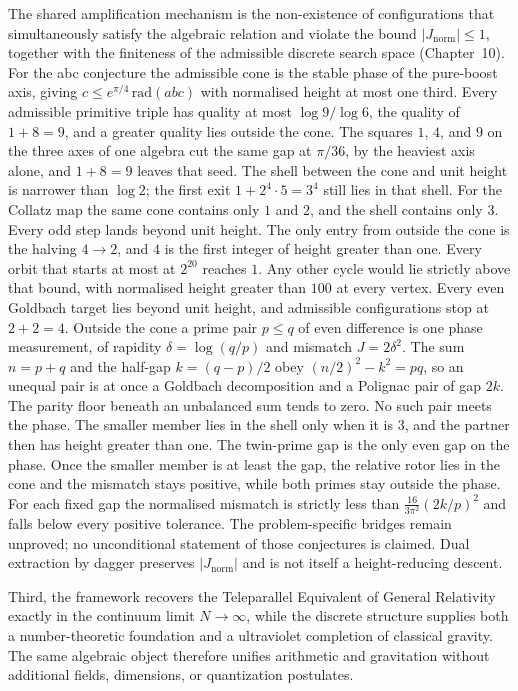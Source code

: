 \documentclass[a4paper]{article}
\theoremstyle{definition}
\theoremstyle{remark}
\newcommand{\Jnorm}{J_{\mathrm{norm}}}
\begin{document}
The shared amplification mechanism is the non-existence of configurations that simultaneously satisfy the algebraic relation and violate the bound \( |\Jnorm| \leq 1 \), together with the finiteness of the admissible discrete search space (Chapter~10). For the abc conjecture the admissible cone is the stable phase of the pure-boost axis, giving \(c\le e^{\pi/4}\,\mathrm{rad}(abc)\) with normalised height at most one third. Every admissible primitive triple has quality at most \(\log 9/\log 6\), the quality of \(1+8=9\), and a greater quality lies outside the cone. The squares \(1\), \(4\), and \(9\) on the three axes of one algebra cut the same gap at \(\pi/36\), by the heaviest axis alone, and \(1+8=9\) leaves that seed. The shell between the cone and unit height is narrower than \(\log 2\); the first exit \(1+2^4\cdot 5=3^4\) still lies in that shell. For the Collatz map the same cone contains only \(1\) and \(2\), and the shell contains only \(3\). Every odd step lands beyond unit height. The only entry from outside the cone is the halving \(4\to 2\), and \(4\) is the first integer of height greater than one. Every orbit that starts at most at \(2^{20}\) reaches \(1\). Any other cycle would lie strictly above that bound, with normalised height greater than \(100\) at every vertex. Every even Goldbach target lies beyond unit height, and admissible configurations stop at \(2+2=4\). Outside the cone a prime pair \(p\le q\) of even difference is one phase measurement, of rapidity \(\delta=\log(q/p)\) and mismatch \(J=2\delta^2\). The sum \(n=p+q\) and the half-gap \(k=(q-p)/2\) obey \((n/2)^2-k^2=pq\), so an unequal pair is at once a Goldbach decomposition and a Polignac pair of gap \(2k\). The parity floor beneath an unbalanced sum tends to zero. No such pair meets the phase. The smaller member lies in the shell only when it is \(3\), and the partner then has height greater than one. The twin-prime gap is the only even gap on the phase. Once the smaller member is at least the gap, the relative rotor lies in the cone and the mismatch stays positive, while both primes stay outside the phase. For each fixed gap the normalised mismatch is strictly less than \(\frac{16}{3\pi^2}(2k/p)^2\) and falls below every positive tolerance. The problem-specific bridges remain unproved; no unconditional statement of those conjectures is claimed. Dual extraction by dagger preserves \(|\Jnorm|\) and is not itself a height-reducing descent.

Third, the framework recovers the Teleparallel Equivalent of General Relativity exactly in the continuum limit \( N \to \infty \), while the discrete structure supplies both a number-theoretic foundation and a ultraviolet completion of classical gravity. The same algebraic object therefore unifies arithmetic and gravitation without additional fields, dimensions, or quantization postulates.
\end{document}
